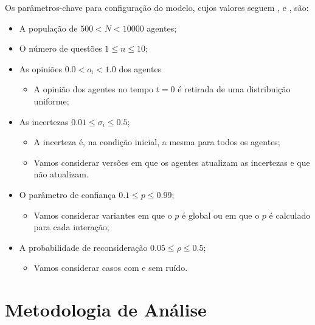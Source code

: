Os parâmetros-chave para configuração do modelo, cujos valores seguem
,  e ,  são:
\begin{itemize}
\item A população de \(500 < N < 10000\) agentes;
\item O número de questões \(1 \leq n \leq 10\); 
\item As opiniões \(0.0< o_i< 1.0\) dos agentes
  \begin{itemize}
  \item A opinião dos agentes no tempo \(t = 0\) é retirada de uma distribuição
    uniforme;
  \end{itemize}
\item As incertezas \(0.01 \leq \sigma_i \leq 0.5\);
  \begin{itemize}
  \item A incerteza é, na condição inicial, a mesma para todos os agentes;
  \item Vamos considerar versões em que os agentes atualizam as incertezas e que
    não atualizam.
  \end{itemize}

\item O parâmetro de confiança \(0.1 \leq p \leq 0.99\);
  \begin{itemize}
  \item Vamos considerar variantes em que o \(p\) é global ou em que o \(p\) é
    calculado para cada interação;
  \end{itemize}
  
\item A probabilidade de reconsideração \(0.05 \leq \rho  \leq 0.5\);
  \begin{itemize}
  \item Vamos considerar casos com e sem ruído.
  \end{itemize}
\end{itemize}


\section{Metodologia de Análise}
























